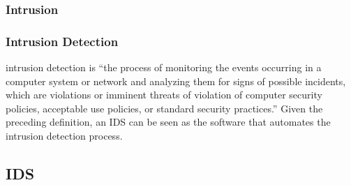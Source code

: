 \subsubsection{Intrusion}
\subsubsection{Intrusion Detection}
intrusion detection is “the process of monitoring the events occurring in a computer system or network and analyzing them for signs of possible incidents, which are violations or imminent threats of violation of computer security policies, acceptable use policies, or standard security practices.” Given the preceding definition, an IDS can be seen as the software that automates the intrusion detection process.
\subsection{IDS}

